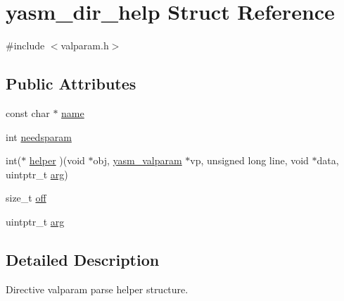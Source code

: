 \hypertarget{structyasm__dir__help}{\section{yasm\-\_\-dir\-\_\-help Struct Reference}
\label{structyasm__dir__help}
}


{\ttfamily \#include $<$valparam.\-h$>$}

\subsection*{Public Attributes}
\begin{DoxyCompactItemize}
\item 
const char $\ast$ \hyperlink{structyasm__dir__help_a81b2e19e375fc5110e0261514907e2e7}{name}
\item 
int \hyperlink{structyasm__dir__help_abe24119f3e3e654ae6547806646eb4c6}{needsparam}
\item 
int($\ast$ \hyperlink{structyasm__dir__help_a3a1b8f80c538883aa9378143369653c0}{helper} )(void $\ast$obj, \hyperlink{structyasm__valparam}{yasm\-\_\-valparam} $\ast$vp, unsigned long line, void $\ast$data, uintptr\-\_\-t \hyperlink{structyasm__dir__help_a754e188fefe91753e51e060cc10b8a2f}{arg})
\item 
size\-\_\-t \hyperlink{structyasm__dir__help_a1824c4b170376581f470e6338b6f95df}{off}
\item 
uintptr\-\_\-t \hyperlink{structyasm__dir__help_a754e188fefe91753e51e060cc10b8a2f}{arg}
\end{DoxyCompactItemize}


\subsection{Detailed Description}
Directive valparam parse helper structure. 

